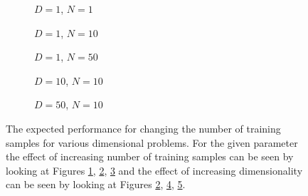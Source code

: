 \begin{figure}[!h]
  \centering
    \begin{subfigure}{0.33\textwidth}
      \centering
      \caption{$D=1$, $N=1$}
      \label{fig:linear-c-N-1-D-1}
    \end{subfigure}
    \begin{subfigure}{0.33\textwidth}
      \centering
      \caption{$D=1$, $N=10$}
      \label{fig:linear-c-N-10-D-1}
    \end{subfigure}
    \begin{subfigure}{0.33\textwidth}
      \centering
      \caption{$D=1$, $N=50$}
      \label{fig:linear-c-N-50-D-1}
    \end{subfigure}

    \begin{subfigure}{0.33\textwidth}
      \centering
      \caption{$D=10$, $N=10$}
      \label{fig:linear-c-N-10-D-10}
    \end{subfigure}
    \begin{subfigure}{0.33\textwidth}
      \centering
      \caption{$D=50$, $N=10$}
      \label{fig:linear-c-N-10-D-50}
    \end{subfigure}  

  \caption{The expected performance for changing the number of training samples for various dimensional problems. For the given parameter the effect of increasing number of training samples can be seen by looking at Figures \ref{fig:linear-c-N-1-D-1}, \ref{fig:linear-c-N-10-D-1}, \ref{fig:linear-c-N-50-D-1} and the effect of increasing dimensionality can be seen by looking at Figures \ref{fig:linear-c-N-10-D-1}, \ref{fig:linear-c-N-10-D-10}, \ref{fig:linear-c-N-10-D-50}.}\label{fig:linear-c}
\end{figure}

